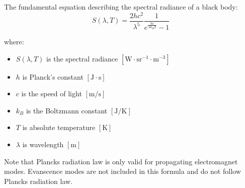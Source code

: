 \documentclass[
  a4paper,
]{book}
\providecommand{\tightlist}{%
  \setlength{\itemsep}{0pt}\setlength{\parskip}{0pt}}
\begin{document}
\begin{tcolorbox}[enhanced jigsaw, coltitle=black, title=\textcolor{quarto-callout-note-color}{\faInfo}\hspace{0.5em}{Planck's Radiation Law}, colframe=quarto-callout-note-color-frame, toprule=.15mm, opacitybacktitle=0.6, left=2mm, opacityback=0, breakable, toptitle=1mm, bottomtitle=1mm, leftrule=.75mm, arc=.35mm, titlerule=0mm, colbacktitle=quarto-callout-note-color!10!white, rightrule=.15mm, bottomrule=.15mm, colback=white]

The fundamental equation describing the spectral radiance of a black
body:
\[S(\lambda,T) = \frac{2hc^2}{\lambda^5} \frac{1}{e^{\frac{hc}{\lambda  k_B T}} - 1}\]

where:

\begin{itemize}
\tightlist
\item
  \(S(\lambda,T)\) is the spectral radiance
  \([\mathrm{W}\cdot\mathrm{sr}^{-1}\cdot\mathrm{m}^{-3}]\)
\item
  \(h\) is Planck's constant \([\mathrm{J}\cdot\mathrm{s}]\)
\item
  \(c\) is the speed of light \([\mathrm{m}/\mathrm{s}]\)
\item
  \(k_B\) is the Boltzmann constant \([\mathrm{J}/\mathrm{K}]\)
\item
  \(T\) is absolute temperature \([\mathrm{K}]\)
\item
  \(\lambda\) is wavelength \([\mathrm{m}]\)
\end{itemize}

Note that Plancks radiation law is only valid for propagating
electromagnet modes. Evanscence modes are not included in this formula
and do not follow Plancks radiation law.

\begin{figure}[H]



\end{figure}
\end{tcolorbox}
\end{document}
